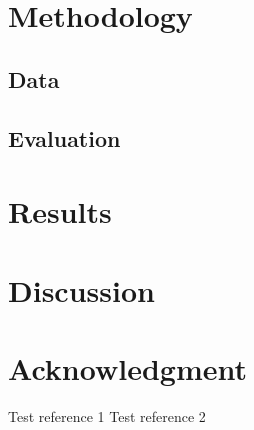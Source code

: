 \documentclass[conference]{IEEEtran}
\begin{document}
\section{Methodology}

\subsection{Data}
\subsection{Evaluation}

\section{Results}
\section{Discussion}

\section*{Acknowledgment}

\begin{thebibliography}{00}
     Test reference 1
     Test reference 2
\end{thebibliography}
\end{document}
